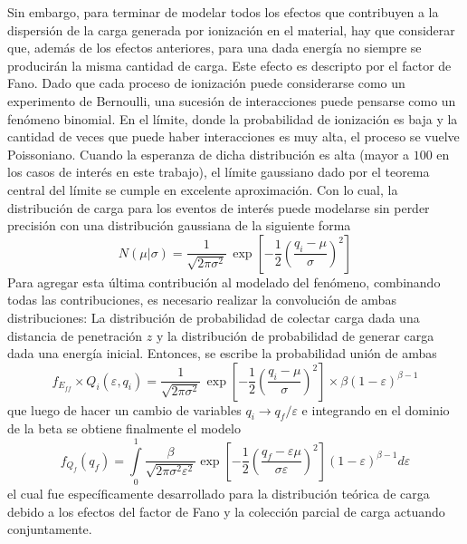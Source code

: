 Sin embargo, para terminar de modelar todos los efectos que contribuyen a la dispersión de la carga generada por ionización en el material, hay que considerar que, además de los efectos anteriores, para una dada energía no siempre se producirán la misma cantidad de carga. Este efecto es descripto por el factor de Fano. Dado que cada proceso de ionización puede considerarse como un experimento de Bernoulli, una sucesión de interacciones puede pensarse como un fenómeno binomial. En el límite, donde la probabilidad de ionización es baja y la cantidad de veces que puede haber interacciones es muy alta, el proceso se vuelve Poissoniano. Cuando la esperanza de dicha distribución es alta (mayor a $100$ en los casos de interés en este trabajo), el límite gaussiano dado por el teorema central del límite se cumple en excelente aproximación. Con lo cual, la distribución de carga para los eventos de interés puede modelarse sin perder precisión con una distribución gaussiana de la siguiente forma
\begin{equation*}
    N(\mu|\sigma) = 
    \frac{1}{\sqrt{2\pi \sigma^{2}}}\,
    \exp
        \left[
            -\frac{1}{2}
            \left(
                \frac{q_{i} - \mu}{\sigma}
            \right)^{2}
        \right]
\end{equation*}
Para agregar esta última contribución al modelado del fenómeno, combinando todas las contribuciones, es necesario realizar la convolución de ambas distribuciones: La distribución de probabilidad de colectar carga dada una distancia de penetración $z$ y la distribución de probabilidad de generar carga dada una energía inicial. Entonces, se escribe la probabilidad unión de ambas
\begin{equation*}
    f_{E_{ff}} \times Q_{i}(\varepsilon, q_{i})
    = \frac{1}{\sqrt{2\pi \sigma^{2}}}\,
    \exp
        \left[
            -\frac{1}{2}
            \left(
                \frac{q_{i} - \mu}{\sigma}
            \right)^{2}
        \right]
    \times
    \beta(1-\varepsilon)^{\beta - 1}
\end{equation*}
que luego de hacer un cambio de variables $q_{i}\longrightarrow q_{f}/\varepsilon$ e integrando en el dominio de la beta se obtiene finalmente el modelo
\begin{equation}
    f_{Q_{f}}(q_{f}) = 
    \int\limits_{0}^{1}
    \frac{\beta}{\sqrt{2\pi \sigma^{2}\varepsilon^{2}}}
    \exp
        \left[
            -\frac{1}{2}
            \left(
                \frac{q_{f} - \varepsilon\mu}{\sigma\varepsilon}
            \right)^{2}
        \right]
    (1-\varepsilon)^{\beta - 1}
    d\varepsilon
    \label{ec:UnbinnedFit}
\end{equation}
el cual fue específicamente desarrollado para la distribución teórica de carga debido a los efectos del factor de Fano y la colección parcial de carga actuando conjuntamente.
